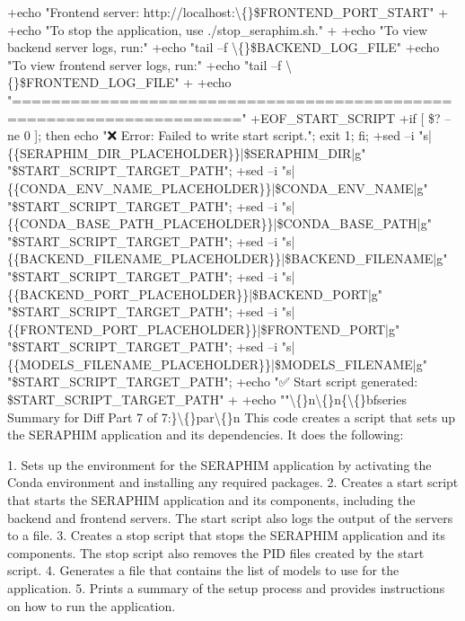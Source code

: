 \documentclass{article}
\begin{document}
{+echo "Frontend server: http://localhost:\textbackslash\{\}\$FRONTEND\_PORT\_START"
+
+echo "To stop the application, use ./stop\_seraphim.sh."
+
+echo "To view backend server logs, run:"
+echo "tail --f \textbackslash\{\}\$BACKEND\_LOG\_FILE"
+echo "To view frontend server logs, run:"
+echo "tail --f \textbackslash\{\}\$FRONTEND\_LOG\_FILE"
+
+echo "====================================================================="
+EOF\_START\_SCRIPT
+if [ \$? --ne 0 ]; then echo "❌ Error: Failed to write start script."; exit 1; fi;
+sed --i "s|\{\{SERAPHIM\_DIR\_PLACEHOLDER\}\}|\$SERAPHIM\_DIR|g" "\$START\_SCRIPT\_TARGET\_PATH";
+sed --i "s|\{\{CONDA\_ENV\_NAME\_PLACEHOLDER\}\}|\$CONDA\_ENV\_NAME|g" "\$START\_SCRIPT\_TARGET\_PATH";
+sed --i "s|\{\{CONDA\_BASE\_PATH\_PLACEHOLDER\}\}|\$CONDA\_BASE\_PATH|g" "\$START\_SCRIPT\_TARGET\_PATH";
+sed --i "s|\{\{BACKEND\_FILENAME\_PLACEHOLDER\}\}|\$BACKEND\_FILENAME|g" "\$START\_SCRIPT\_TARGET\_PATH";
+sed --i "s|\{\{BACKEND\_PORT\_PLACEHOLDER\}\}|\$BACKEND\_PORT|g" "\$START\_SCRIPT\_TARGET\_PATH";
+sed --i "s|\{\{FRONTEND\_PORT\_PLACEHOLDER\}\}|\$FRONTEND\_PORT|g" "\$START\_SCRIPT\_TARGET\_PATH";
+sed --i "s|\{\{MODELS\_FILENAME\_PLACEHOLDER\}\}|\$MODELS\_FILENAME|g" "\$START\_SCRIPT\_TARGET\_PATH";
+echo "✅ Start script generated: \$START\_SCRIPT\_TARGET\_PATH"
+
+echo ""\textbackslash\{\}n\textbackslash\{\}n\{\textbackslash\{\}bfseries Summary for Diff Part 7 of 7:\}\textbackslash\{\}par\textbackslash\{\}n  This code creates a script that sets up the SERAPHIM application and its dependencies. It does the following:

1. Sets up the environment for the SERAPHIM application by activating the Conda environment and installing any required packages.
2. Creates a start script that starts the SERAPHIM application and its components, including the backend and frontend servers. The start script also logs the output of the servers to a file.
3. Creates a stop script that stops the SERAPHIM application and its components. The stop script also removes the PID files created by the start script.
4. Generates a file that contains the list of models to use for the application.
5. Prints a summary of the setup process and provides instructions on how to run the application.

}
\end{document}
